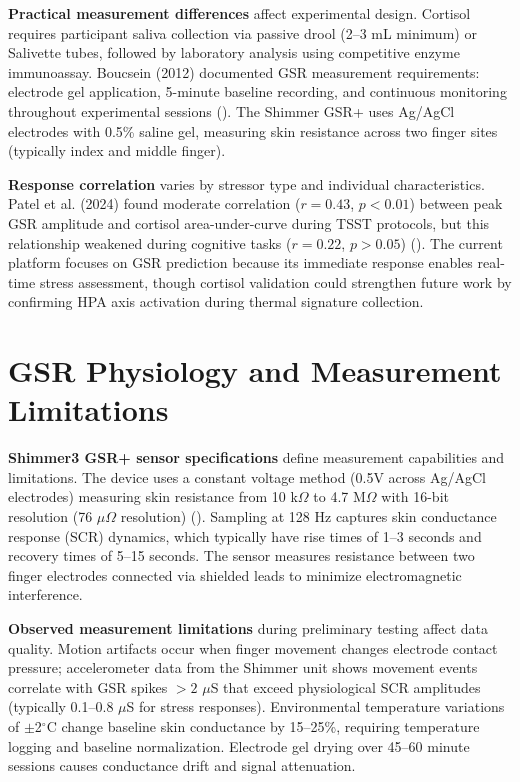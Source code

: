 \textbf{Practical measurement differences} affect experimental design. Cortisol requires participant saliva collection via passive drool (2--3 mL minimum) or Salivette tubes, followed by laboratory analysis using competitive enzyme immunoassay. Boucsein (2012) documented GSR measurement requirements: electrode gel application, 5-minute baseline recording, and continuous monitoring throughout experimental sessions (\citep{ref1}). The Shimmer GSR+ uses Ag/AgCl electrodes with 0.5\% saline gel, measuring skin resistance across two finger sites (typically index and middle finger).

\textbf{Response correlation} varies by stressor type and individual characteristics. Patel et al. (2024) found moderate correlation ($r = 0.43$, $p < 0.01$) between peak GSR amplitude and cortisol area-under-curve during TSST protocols, but this relationship weakened during cognitive tasks ($r = 0.22$, $p > 0.05$) (\citep{ref7}). The current platform focuses on GSR prediction because its immediate response enables real-time stress assessment, though cortisol validation could strengthen future work by confirming HPA axis activation during thermal signature collection.

\section{GSR Physiology and Measurement Limitations}
\textbf{Shimmer3 GSR+ sensor specifications} define measurement capabilities and limitations. The device uses a constant voltage method (0.5V across Ag/AgCl electrodes) measuring skin resistance from 10 k$\Omega$ to 4.7 M$\Omega$ with 16-bit resolution (76 $\mu\Omega$ resolution) (\citep{ref8}). Sampling at 128 Hz captures skin conductance response (SCR) dynamics, which typically have rise times of 1--3 seconds and recovery times of 5--15 seconds. The sensor measures resistance between two finger electrodes connected via shielded leads to minimize electromagnetic interference.

\textbf{Observed measurement limitations} during preliminary testing affect data quality. Motion artifacts occur when finger movement changes electrode contact pressure; accelerometer data from the Shimmer unit shows movement events correlate with GSR spikes $>2$ $\mu$S that exceed physiological SCR amplitudes (typically 0.1--0.8 $\mu$S for stress responses). Environmental temperature variations of $\pm$2$^\circ$C change baseline skin conductance by 15--25\%, requiring temperature logging and baseline normalization. Electrode gel drying over 45--60 minute sessions causes conductance drift and signal attenuation.

